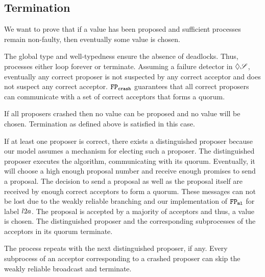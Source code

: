 \subsection{Termination}

We want to prove that if a value has been proposed and sufficient processes remain non-faulty, then eventually some value is chosen.

The global type and well-typedness ensure the absence of deadlocks.
Thus, processes either loop forever or terminate.
Assuming a failure detector in $\Diamond\mathscr{S}$, eventually any correct proposer is not suspected by any correct acceptor and does not suspect any correct acceptor.
$\mathtt{FP_{crash}}$ guarantees that all correct proposers can communicate with a set of correct acceptors that forms a quorum.

If all proposers crashed then no value can be proposed and no value will be chosen.
Termination as defined above is satisfied in this case.

If at least one proposer is correct, there exists a distinguished proposer because our model assumes a mechanism for electing such a proposer.
The distinguished proposer executes the algorithm, communicating with its quorum.
Eventually, it will choose a high enough proposal number and receive enough promises to send a proposal.
The decision to send a proposal as well as the proposal itself are received by enough correct acceptors to form a quorum.
These messages can not be lost due to the weakly reliable branching and our implementation of $\mathtt{FP_{ml}}$ for label $l2a$.
The proposal is accepted by a majority of acceptors and thus, a value is chosen.
The distinguished proposer and the corresponding subprocesses of the acceptors in its quorum terminate.

The process repeats with the next distinguished proposer, if any.
Every subprocess of an acceptor corresponding to a crashed proposer can skip the weakly reliable broadcast and terminate.
